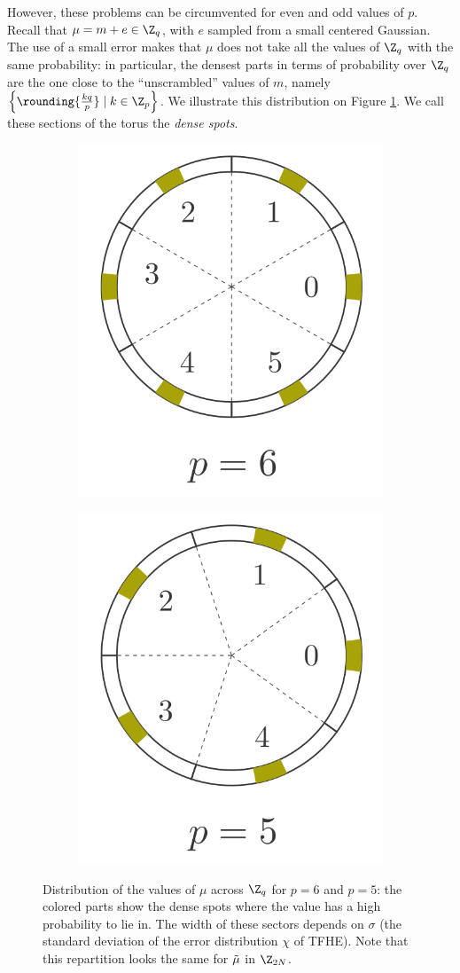 However, these problems can be circumvented for even and odd values of $p$. Recall that $\mu = m + e \in \Z_q$, with $e$ sampled from a small centered Gaussian. The use of a small error makes that $\mu$ does not take all the values of $\Z_q$ with the same probability: in particular, the densest parts in terms of probability over $\Z_q$ are the one close to the ``unscrambled'' values of $m$, namely $\left \{ \rounding{\frac {k q}{p}} \mid k \in \Z_p \right \}$. We illustrate this distribution on Figure \ref{fig:density_of_phase}. We call these sections of the torus the \emph{dense spots}.


\begin{figure}
    \begin{subfigure}{0.49\linewidth}
        \centering
        \includegraphics[width=0.5\linewidth]{images/busy_sectors_2.png}
    \end{subfigure}\hspace{1em}%
    \begin{subfigure}{0.49\linewidth}%
        \centering
        \includegraphics[width=0.5\linewidth]{images/busy_sectors.png}
    \end{subfigure}
    \caption{Distribution of the values of $\mu$ across $\Z_{q}$ for $p = 6$ and $p = 5$: the colored parts show the dense spots where the value has a high probability to lie in. The width of these sectors depends on $\sigma$ (the standard deviation of the error distribution $\chi$ of TFHE). Note that this repartition looks the same for $\Tilde{\mu}$ in $\Z_{2N}$.}    
    \label{fig:density_of_phase}
\end{figure}


